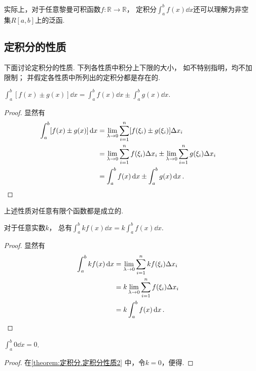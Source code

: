 实际上，对于任意黎曼可积函数\(f\colon \mathbb{R} \to \mathbb{R}\)，
定积分\(\int_a^b f(x) \dd{x}\)还可以理解为非空集\(R[a,b]\)上的泛函.

\subsection{定积分的性质}
下面讨论定积分的性质.
下列各性质中积分上下限的大小，
如不特别指明，均不加限制；
并假定各性质中所列出的定积分都是存在的.
\begin{property}\label{theorem:定积分.定积分性质1}
\(\int_a^b [f(x) \pm g(x)] \dd{x}
= \int_a^b f(x) \dd{x} \pm \int_a^b g(x) \dd{x}\).
\begin{proof}
显然有\begin{align*}
	\int_a^b [f(x) \pm g(x)] \dd{x}
	&= \lim_{\lambda\to0}
		\sum_{i=1}^n [f(\xi_i) \pm g(\xi_i)] \Delta x_i \\
	&= \lim_{\lambda\to0}
		\sum_{i=1}^n f(\xi_i) \Delta x_i
		\pm
		\lim_{\lambda\to0}
		\sum_{i=1}^n g(\xi_i) \Delta x_i \\
	&= \int_a^b f(x) \dd{x} \pm \int_a^b g(x) \dd{x}.
	\qedhere
\end{align*}
\end{proof}
\end{property}
上述性质对任意有限个函数都是成立的.

\begin{property}\label{theorem:定积分.定积分性质2}
对于任意实数\(k\)，
总有\(\int_a^b k f(x) \dd{x}
=k\int_a^b f(x) \dd{x}\).
\begin{proof}
显然有\begin{align*}
	\int_a^b k f(x) \dd{x}
	&= \lim_{\lambda\to0}
		\sum_{i=1}^n k f(\xi_i) \Delta x_i \\
	&= k \lim_{\lambda\to0}
		\sum_{i=1}^n f(\xi_i) \Delta x_i \\
	&= k \int_a^b f(x) \dd{x}.
	\qedhere
\end{align*}
\end{proof}
\end{property}

\begin{corollary}\label{theorem:定积分.定积分性质2推论1}
\(\int_a^b 0 \dd{x} = 0\).
\begin{proof}
在\cref{theorem:定积分.定积分性质2} 中，令\(k=0\)，便得.
\end{proof}
\end{corollary}

